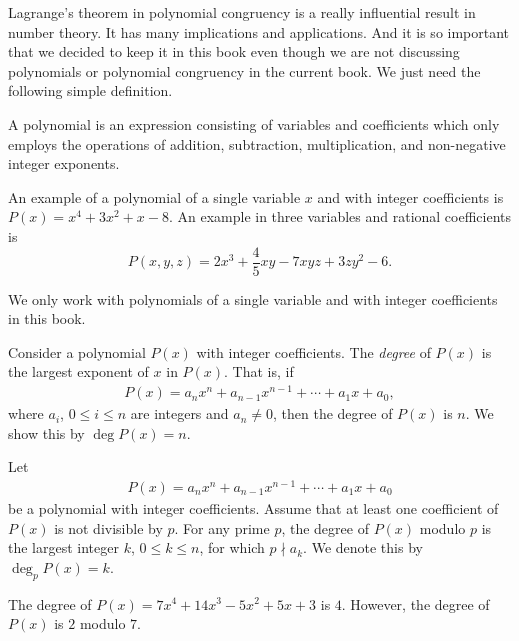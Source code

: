 \documentclass[12pt]{subfile}
\begin{document}
	Lagrange's theorem in polynomial congruency is a really influential result in number theory. It has many implications and applications. And it is so important that we decided to keep it in this book even though we are not discussing polynomials or polynomial congruency in the current book. We just need the following simple definition.

		\begin{definition}
			A polynomial is an expression consisting of variables and coefficients which only employs the operations of addition, subtraction, multiplication, and non-negative integer exponents.
		\end{definition}

		\begin{example}
			An example of a polynomial of a single variable $x$ and with integer coefficients is $P(x)=x^4+3x^2 + x -8$. An example in three variables and rational coefficients is $$P(x,y,z)=2x^3 + \frac{4}{5}xy- 7xyz + 3zy^2 - 6.$$
		\end{example}

		\begin{note}
			We only work with polynomials of a single variable and with integer coefficients in this book.
		\end{note}

		\begin{definition}
			Consider a polynomial $P(x)$ with integer coefficients. The \textit{degree} of $P(x)$ is the largest exponent of $x$ in $P(x)$. That is, if
				\begin{align*}
					P(x)=a_nx^n + a_{n-1}x^{n-1} + \cdots + a_1 x +a_0,
				\end{align*}
			 where $a_i$, $0 \leq i \leq n$ are integers and $a_n \neq 0$, then the degree of $P(x)$ is $n$. We show this by $\deg P(x)=n$.
		\end{definition}

		\begin{definition}
			Let
				\begin{align*}
					P(x)=a_nx^n + a_{n-1}x^{n-1} + \cdots + a_1 x +a_0
				\end{align*}
			be a polynomial with integer coefficients. Assume that at least one coefficient of $P(x)$ is not divisible by $p$. For any prime $p$, the degree of $P(x)$ modulo $p$ is the largest integer $k$, $0 \leq k \leq n$,  for which $p \nmid a_k$. We denote this by $\deg_p P(x)=k$.
		\end{definition}

		\begin{example}
			The degree of $P(x)=7x^4 + 14x^3 - 5x^2 + 5x + 3$ is $4$. However, the degree of $P(x)$ is $2$ modulo $7$.
		\end{example}
\end{document}
